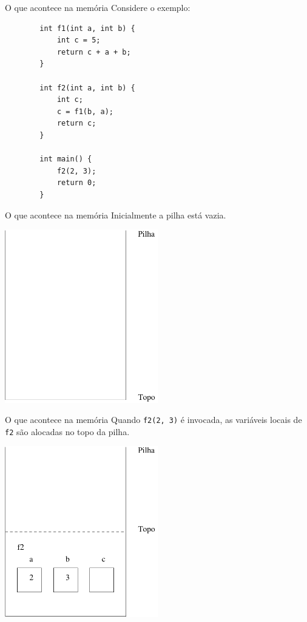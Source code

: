 \documentclass[handout]{beamer}
\newcommand{\cod}[1]{\texttt{#1}}
\begin{document}
\begin{frame}[fragile]{O que acontece na memória}
    Considere o exemplo:
    \begin{verbatim}
        int f1(int a, int b) {
            int c = 5;
            return c + a + b;
        }

        int f2(int a, int b) {
            int c;
            c = f1(b, a);
            return c;
        }

        int main() {
            f2(2, 3);
            return 0;
        }
    \end{verbatim}
\end{frame}

\begin{frame}[fragile]{O que acontece na memória}
    Inicialmente a pilha está vazia.
    \begin{center}
        \includegraphics[width=0.5\textwidth]{figs/pilha0}
    \end{center}
\end{frame}

\begin{frame}[fragile]{O que acontece na memória}
    Quando \cod{f2(2, 3)} é invocada, as variáveis locais de \cod{f2} são alocadas no topo da pilha.
    \begin{center}
        \includegraphics[width=0.5\textwidth]{figs/pilha1}
    \end{center}
\end{frame}
\end{document}
